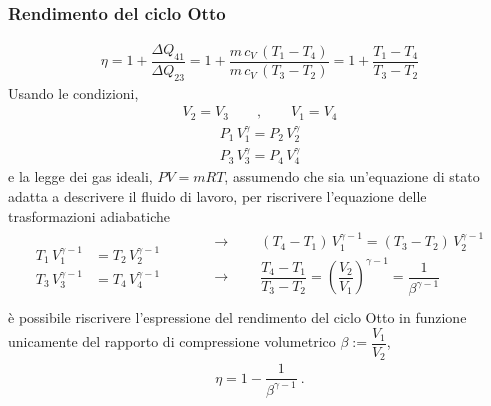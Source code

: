 \documentclass[letterpaper,10pt,italian]{jupyterBook}
\begin{document}
\subsubsection{Rendimento del ciclo Otto}
\label{\detokenize{ch/thermodynamics/heat-engine-otto:rendimento-del-ciclo-otto}}\begin{equation*}
\begin{split}\eta = 1 + \dfrac{\Delta Q_{41}}{\Delta Q_{23}}
       = 1 + \dfrac{m \, c_V \, (T_1 - T_4)}{m \, c_V \, (T_3 - T_2)}
       = 1 + \dfrac{T_1 - T_4}{T_3 - T_2}
\end{split}
\end{equation*}
\sphinxAtStartPar
Usando le condizioni,  
\begin{equation*}
\begin{split}V_2 = V_3 \qquad , \qquad V_1 = V_4\end{split}
\end{equation*}\begin{equation*}
\begin{split}P_1 \, V_1^{\gamma} = P_2 \, V_2^{\gamma}\end{split}
\end{equation*}\begin{equation*}
\begin{split}P_3 \, V_3^{\gamma} = P_4 \, V_4^{\gamma}\end{split}
\end{equation*}
\sphinxAtStartPar
e la legge dei gas ideali, \(P V = m R T\), assumendo che sia un’equazione di stato adatta a descrivere il fluido di lavoro, per riscrivere l’equazione delle trasformazioni adiabatiche
\begin{equation*}
\begin{split}\begin{aligned}
  T_1 \, V_1^{\gamma-1} & = T_2 \, V_2^{\gamma-1} \\
  T_3 \, V_3^{\gamma-1} & = T_4 \, V_4^{\gamma-1}
\end{aligned}
\begin{aligned}
  & \qquad \rightarrow \qquad  (T_4 - T_1) \, V_1^{\gamma-1} = (T_3 - T_2) \, V_2^{\gamma - 1} \\
  & \qquad \rightarrow \qquad  \dfrac{T_4 - T_1}{T_3 - T_2} = \left( \dfrac{V_2}{V_1} \right)^{\gamma-1} = \dfrac{1}{\beta^{\gamma - 1}} \\
\end{aligned}
\end{split}
\end{equation*}
\sphinxAtStartPar
è possibile riscrivere l’espressione del rendimento del ciclo Otto in funzione unicamente del rapporto di compressione volumetrico \(\beta := \dfrac{V_1}{V_2}\),
\begin{equation*}
\begin{split}\eta = 1 - \dfrac{1}{\beta^{\gamma-1}} \ .\end{split}
\end{equation*}
\end{document}
